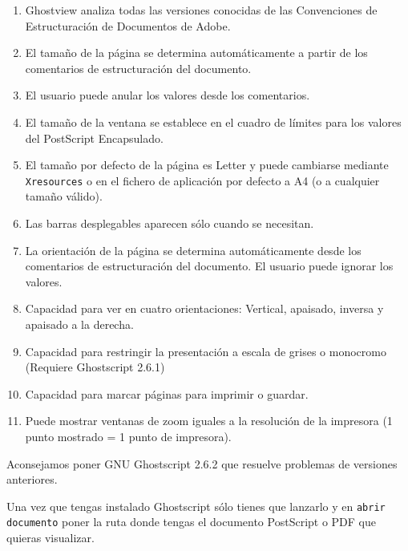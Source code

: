 \begin{enumerate}

\item {\sf  Ghostview} analiza  todas las  versiones conocidas  de las
{\sf Convenciones de Estructuración de Documentos de Adobe}.

\item El tamaño de la página  se determina automáticamente a partir de
los comentarios de estructuración del documento.

\item El usuario puede anular los valores desde los comentarios.

\item El  tamaño de la  ventana se establece  en el cuadro  de límites
para los valores del PostScript Encapsulado.

\item El tamaño  por defecto de la página es  Letter y puede cambiarse
mediante {\tt Xresources} o en el  fichero de aplicación por defecto a
A4 (o a cualquier tamaño válido).

\item Las barras desplegables aparecen sólo cuando se necesitan.

\item La orientación  de la página se  determina automáticamente desde
los  comentarios de  estructuración  del documento.  El usuario  puede
ignorar los valores.

\item Capacidad para ver  en cuatro orientaciones: Vertical, apaisado,
inversa y apaisado a la derecha.

\item Capacidad para  restringir la presentación a escala  de grises o
monocromo (Requiere {\sf Ghostscript 2.6.1})

\item Capacidad para marcar páginas para imprimir o guardar.

\item Puede  mostrar ventanas de  zoom iguales  a la resolución  de la
impresora (1 punto mostrado = 1 punto de impresora).

\end{enumerate}

Aconsejamos poner  GNU {\sf Ghostscript 2.6.2}  que resuelve problemas
de versiones anteriores.

Una  vez  que  tengas  instalado {\sf  Ghostscript}  sólo  tienes  que
lanzarlo y  en {\tt  abrir documento}  poner la  ruta donde  tengas el
documento PostScript o PDF que quieras visualizar.

